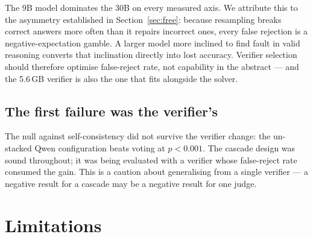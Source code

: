 \documentclass[conference]{IEEEtran}
\begin{document}
The 9B model dominates the 30B on every measured axis. We attribute this to the asymmetry
established in Section~\ref{sec:free}: because resampling breaks correct answers more often
than it repairs incorrect ones, every false rejection is a negative-expectation gamble. A
larger model more inclined to find fault in valid reasoning converts that inclination
directly into lost accuracy. Verifier selection should therefore optimise false-reject
rate, not capability in the abstract --- and the 5.6\,GB verifier is also the one that fits
alongside the solver.

\subsection{The first failure was the verifier's}

The null against self-consistency did not survive the verifier change: the un-stacked Qwen
configuration beats voting at $p<0.001$. The cascade design was sound throughout; it was
being evaluated with a verifier whose false-reject rate consumed the gain. This is a
caution about generalising from a single verifier --- a negative result for a cascade may be
a negative result for one judge.

\section{Limitations}
\label{sec:limits}
\end{document}
